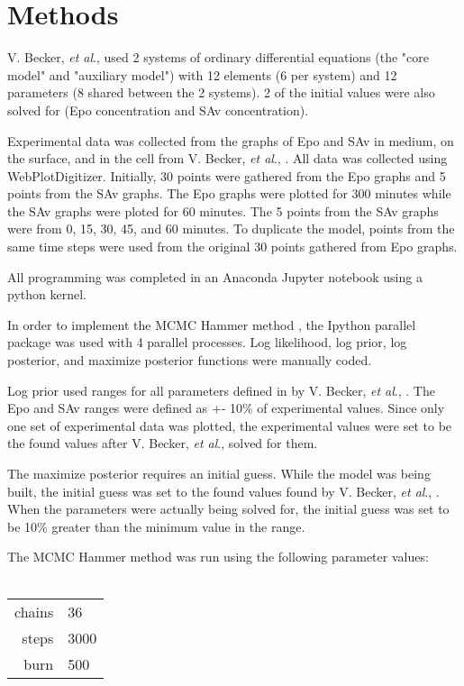 \documentclass[12pt]{article}
\begin{document}
\section*{Methods}

V. Becker, \textit{et al}., \cite{beck} used 2 systems of ordinary differential equations (the "core model" and "auxiliary model") with 12 elements (6 per system) and 12 parameters (8 shared between the 2 systems). 2 of the initial values were also solved for (Epo concentration and SAv concentration).

Experimental data was collected from the graphs of Epo and SAv in medium, on the surface, and in the cell from  V. Becker, \textit{et al}., \cite{beck}. All data was collected using WebPlotDigitizer. Initially, 30 points were gathered from the Epo graphs and 5 points from the SAv graphs. The Epo graphs were plotted for 300 minutes while the SAv graphs were ploted for 60 minutes. The 5 points from the SAv graphs were from 0, 15, 30, 45, and 60 minutes. To duplicate the model, points from the same time steps were used from the original 30 points gathered from Epo graphs. 

All programming was completed in an Anaconda Jupyter notebook using a python kernel. 

In order to implement the MCMC Hammer method \cite{emcee}, the Ipython parallel package was used with 4 parallel processes. Log likelihood, log prior, log posterior, and maximize posterior functions were manually coded. 

Log prior used ranges for all parameters defined in by V. Becker, \textit{et al}., \cite{beck}. The Epo and SAv ranges were defined as +- 10\% of experimental values. Since only one set of experimental data was plotted, the experimental values were set to be the found values after V. Becker, \textit{et al}., \cite{beck} solved for them. 

The maximize posterior requires an initial guess. While the model was being built, the initial guess was set to the found values found by V. Becker, \textit{et al}., \cite{beck}. When the parameters were actually being solved for, the initial guess was set to be 10\%  greater than the minimum value in the range.

The MCMC Hammer method \cite{emcee} was run using the following parameter values:
\\
\\
\begin{center}
\begin{tabular}{r|l}
chains & 36 \\
steps & 3000 \\
burn & 500   \\
\end{tabular}
\end{center}
\end{document}
